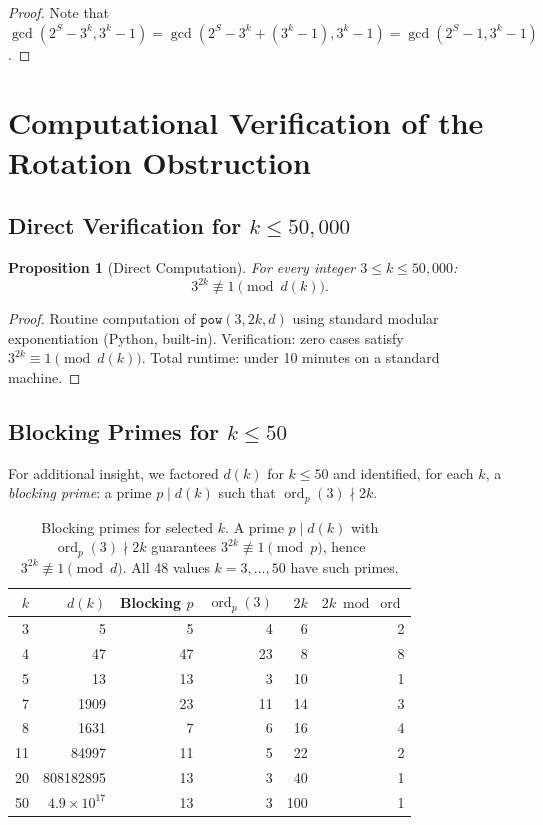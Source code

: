 \documentclass[12pt,a4paper]{amsart}
\theoremstyle{plain}
\newtheorem{proposition}[theorem]{Proposition}
\theoremstyle{definition}
\newcommand{\ord}{\operatorname{ord}}
\renewcommand{\gcd}{\operatorname{gcd}}
\begin{document}
\begin{proof}
Note that $\gcd(2^S - 3^k, 3^k - 1) = \gcd(2^S - 3^k + (3^k - 1), 3^k - 1) = \gcd(2^S - 1, 3^k - 1)$.
\end{proof}

\section{Computational Verification of the Rotation Obstruction}
\label{sec:computational}

\subsection{Direct Verification for $k \leq 50{,}000$}

\begin{proposition}[Direct Computation]
\label{prop:computation}
For every integer $3 \leq k \leq 50{,}000$:
\[
3^{2k} \not\equiv 1 \pmod{d(k)}.
\]
\end{proposition}

\begin{proof}
Routine computation of $\texttt{pow}(3, 2k, d)$ using standard modular exponentiation (Python, built-in). Verification: zero cases satisfy $3^{2k} \equiv 1 \pmod{d(k)}$. Total runtime: under 10 minutes on a standard machine.
\end{proof}

\subsection{Blocking Primes for $k \leq 50$}

For additional insight, we factored $d(k)$ for $k \leq 50$ and identified, for each $k$, a \emph{blocking prime}: a prime $p \mid d(k)$ such that $\ord_p(3) \nmid 2k$.

\begin{table}[h!]
\centering
\small
\begin{tabular}{@{}rrrrrr@{}}
\toprule
$k$ & $d(k)$ & Blocking $p$ & $\ord_p(3)$ & $2k$ & $2k \bmod \ord$ \\
\midrule
3 & 5 & 5 & 4 & 6 & 2 \\
4 & 47 & 47 & 23 & 8 & 8 \\
5 & 13 & 13 & 3 & 10 & 1 \\
7 & 1909 & 23 & 11 & 14 & 3 \\
8 & 1631 & 7 & 6 & 16 & 4 \\
11 & 84997 & 11 & 5 & 22 & 2 \\
20 & 808182895 & 13 & 3 & 40 & 1 \\
50 & $4.9 \times 10^{17}$ & 13 & 3 & 100 & 1 \\
\bottomrule
\end{tabular}
\caption{Blocking primes for selected $k$. A prime $p \mid d(k)$ with $\ord_p(3) \nmid 2k$ guarantees $3^{2k} \not\equiv 1 \pmod{p}$, hence $3^{2k} \not\equiv 1 \pmod{d}$. All 48 values $k = 3, \ldots, 50$ have such primes.}
\label{tab:blocking}
\end{table}
\end{document}
